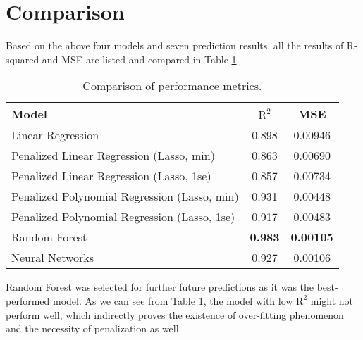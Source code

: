\section{Comparison} %
\label{sec:Comparison}
Based on the above four models and seven prediction results, all the results of R-squared and MSE are listed and compared in Table \ref{4.2.6-TABLE}. 

\begin{table}[htbp]
  \centering
  \footnotesize
  \begin{tabular}{p{6.7cm} | c | c}
  \toprule
  Model & $\text{R}^2$ & MSE\\ %
  \hline
  Linear Regression & 0.898 & 0.00946\\
  Penalized Linear Regression (Lasso, min) & 0.863 & 0.00690\\
  Penalized Linear Regression (Lasso, 1se) & 0.857 & 0.00734\\
  Penalized Polynomial Regression (Lasso, min) & 0.931 & 0.00448\\
  Penalized Polynomial Regression (Lasso, 1se) & 0.917 & 0.00483\\
  Random Forest & \textbf{0.983} & \textbf{0.00105}\\
  Neural Networks & 0.927 & 0.00106\\
  \bottomrule
  \end{tabular}
  \caption{Comparison of performance metrics.}
  \label{4.2.6-TABLE}
\end{table}

Random Forest was selected for further future predictions as it was the best-performed model. As we can see from Table \ref{4.2.6-TABLE}, the model with low $\text{R}^2$ might not perform well, which indirectly proves the existence of over-fitting phenomenon and the necessity of penalization as well.